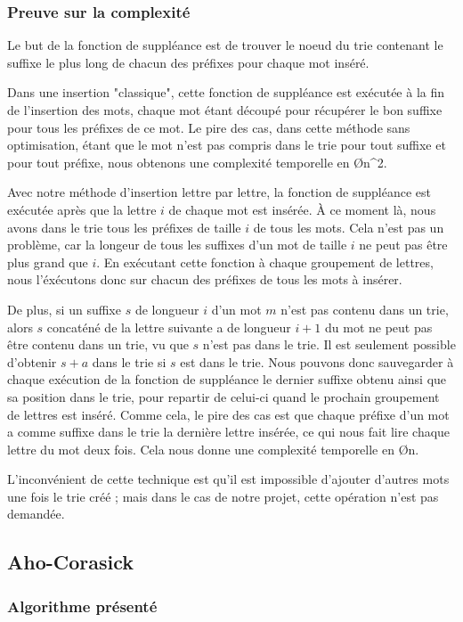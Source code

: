 \subsubsection*{Preuve sur la complexité}
Le but de la fonction de suppléance est de trouver le noeud du trie contenant le
suffixe le plus long de chacun des préfixes pour chaque mot inséré.

Dans une insertion "classique", cette fonction de suppléance est exécutée à la fin
de l'insertion des mots, chaque mot étant découpé pour récupérer le bon suffixe
pour tous les préfixes de ce mot.
Le pire des cas, dans cette méthode sans optimisation, étant que le mot n'est
pas compris dans le trie pour tout suffixe et pour tout préfixe, nous obtenons
une complexité temporelle en \O{n^2}.

Avec notre méthode d'insertion lettre par lettre, la fonction de suppléance est
exécutée après que la lettre $i$ de chaque mot est insérée. À ce moment là, nous
avons dans le trie tous les préfixes de taille $i$ de tous les mots. Cela n'est
pas un problème, car la longeur de tous les suffixes d'un mot de taille $i$ ne peut
pas être plus grand que $i$. En exécutant cette fonction à chaque groupement de
lettres, nous l'éxécutons donc sur chacun des préfixes de tous les mots à insérer.

De plus, si un suffixe $s$ de longueur $i$ d'un mot $m$ n'est pas contenu dans un trie, alors $s$
concaténé de la lettre suivante a de longueur $i + 1$ du mot ne peut pas être contenu dans un trie,
vu que $s$ n'est pas dans le trie.
Il est seulement possible d'obtenir $s + a$ dans le trie si $s$ est dans le trie.
Nous pouvons donc sauvegarder à chaque exécution de la fonction de suppléance
le dernier suffixe obtenu ainsi que sa position dans le trie, pour repartir de
celui-ci quand le prochain groupement de lettres est inséré. Comme cela, le pire
des cas est que chaque préfixe d'un mot a comme suffixe dans le trie la dernière
lettre insérée, ce qui nous fait lire chaque lettre du mot deux fois.
Cela nous donne une complexité temporelle en \O{n}.

L'inconvénient de cette technique est qu'il est impossible d'ajouter d'autres mots
une fois le trie créé ; mais dans le cas de notre projet, cette opération n'est pas
demandée.

\subsection{Aho-Corasick}
\subsubsection*{Algorithme présenté}

